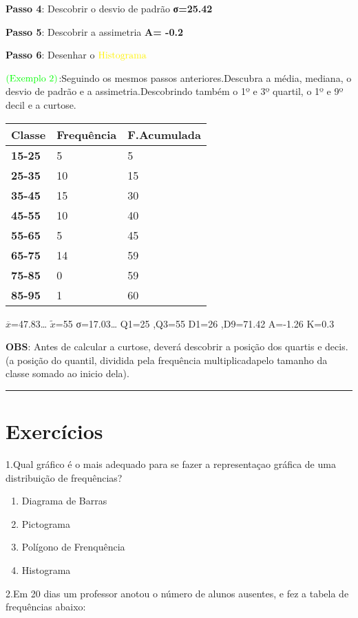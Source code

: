 \documentclass[]{book}
\begin{document}
\textbf{Passo 4}: Descobrir o desvio de padrão \textbf{σ=25.42}

\textbf{Passo 5}: Descobrir a assimetria \textbf{A= -0.2}

\textbf{Passo 6}: Desenhar o \(\color{yellow}{\text{Histograma}}\)

\(\color{green}{\text{(Exemplo 2)}}\):Seguindo os mesmos passos anteriores.Descubra a média, mediana, o desvio de padrão e a assimetria.Descobrindo também o 1º e 3º quartil, o 1º e 9º decil e a curtose.

\begin{longtable}[]{@{}lll@{}}
\toprule
\textbf{Classe} & \textbf{Frequência} & \textbf{F.Acumulada}\tabularnewline
\midrule
\endhead
\textbf{15-25} & 5 & 5\tabularnewline
\textbf{25-35} & 10 & 15\tabularnewline
\textbf{35-45} & 15 & 30\tabularnewline
\textbf{45-55} & 10 & 40\tabularnewline
\textbf{55-65} & 5 & 45\tabularnewline
\textbf{65-75} & 14 & 59\tabularnewline
\textbf{75-85} & 0 & 59\tabularnewline
\textbf{85-95} & 1 & 60\tabularnewline
\bottomrule
\end{longtable}

\(\overline x\)=47.83\ldots{}
\(\tilde{x}\)=55
σ=17.03\ldots{}
Q1=25 ,Q3=55
D1=26 ,D9=71.42
A=-1.26
K=0.3

\textbf{OBS}: Antes de calcular a curtose, deverá descobrir a posição dos quartis e decis.(a posição do quantil, dividida pela frequência multiplicadapelo tamanho da classe somado ao inicio dela).

\begin{center}\rule{0.5\linewidth}{\linethickness}\end{center}

\hypertarget{exercicios-1}{%
\section{Exercícios}\label{exercicios-1}}

1.Qual gráfico é o mais adequado para se fazer a representaçao gráfica de uma distribuição de frequências?

\begin{enumerate}
\def\labelenumi{\alph{enumi})}
\item
  Diagrama de Barras
\item
  Pictograma
\item
  Polígono de Frenquência
\item
  Histograma
\end{enumerate}

2.Em 20 dias um professor anotou o número de alunos ausentes, e fez a tabela de frequências abaixo:
\end{document}
